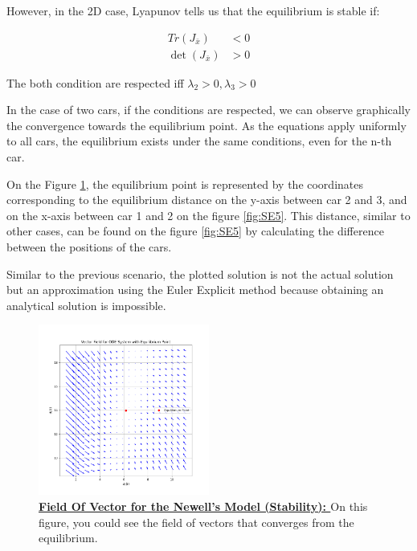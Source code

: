 \documentclass{article}
\begin{document}
	However, in the 2D case, Lyapunov tells us that the equilibrium is stable if:
	
	\[
	\boxed{
		\begin{aligned}
			Tr(J_{\bar{x}}) &< 0 \\
			\det(J_{\bar{x}}) &> 0
		\end{aligned}
	}
	\]

	The both condition are respected iff $\lambda_2>0, \lambda_3>0$
	 \newline\newline
	 
	In the case of two cars, if the conditions are respected, we can observe graphically the convergence towards the equilibrium point. As the equations apply uniformly to all cars, the equilibrium exists under the same conditions, even for the n-th car.
	
	On the Figure \ref{fig:SE4}, the equilibrium point is represented by the coordinates corresponding to the equilibrium distance on the y-axis between car 2 and 3, and on the x-axis between car 1 and 2 on the figure \ref{fig:SE5}. This distance, similar to other cases, can be found on the figure \ref{fig:SE5} by calculating the difference between the positions of the cars.
	
	Similar to the previous scenario, the plotted solution is not the actual solution but an approximation using the Euler Explicit method because obtaining an analytical solution is impossible.
	 
	 
	 \begin{figure}[H]
	 	\centering
	 	\includegraphics[width=0.5\textwidth]{VectorField1.png}
	 	\caption{\textbf{\underline{Field Of Vector for the Newell's Model (Stability): }} On this figure, you could see the field of vectors that converges from the equilibrium.}
	 	\label{fig:SE4}
	 \end{figure}
	 
\end{document}
